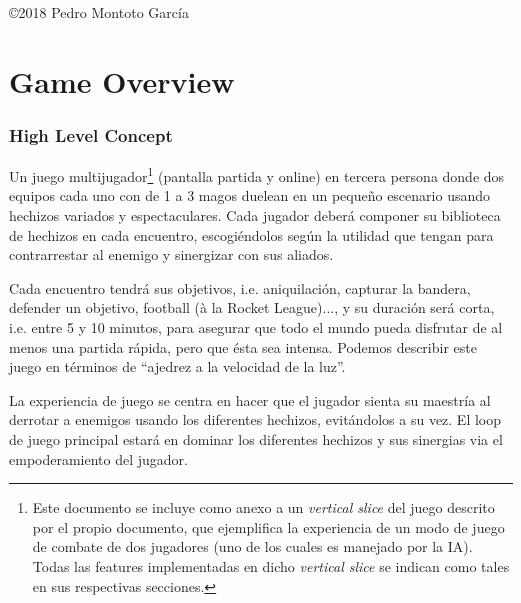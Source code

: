 \documentclass[12pt]{report}
\begin{document}
\vfill %

{\centering \hfill \copyright 2018 Pedro Montoto García} \\


\clearpage

\tableofcontents

\cleardoublepage

\setlength{\voffset}{0cm}
\setlength{\parindent}{1cm}
\setcounter{page}{1}

\part{Game Overview}

\section{High Level Concept}
\pagestyle{fancy}

Un juego multijugador\footnote{Este documento se incluye como anexo a un \textit{vertical slice} del juego descrito por el propio documento, que ejemplifica la experiencia de un modo de juego de combate de dos jugadores (uno de los cuales es manejado por la IA). Todas las features implementadas en dicho \textit{vertical slice} se indican como tales en sus respectivas secciones.} (pantalla partida y online) en tercera persona donde dos equipos cada uno con de 1 a 3 magos duelean en un pequeño escenario usando hechizos variados y espectaculares. Cada jugador deberá componer su biblioteca de hechizos en cada encuentro, escogiéndolos según la utilidad que tengan para contrarrestar al enemigo y sinergizar con sus aliados. 

Cada encuentro tendrá sus objetivos, i.e. aniquilación, capturar la bandera, defender un objetivo, football (à la Rocket League)..., y su duración será corta, i.e. entre 5 y 10 minutos, para asegurar que todo el mundo pueda disfrutar de al menos una partida rápida, pero que ésta sea intensa. Podemos describir este juego en términos de ``ajedrez a la velocidad de la luz''.

La experiencia de juego se centra en hacer que el jugador sienta su maestría al derrotar a enemigos usando los diferentes hechizos, evitándolos a su vez. El loop de juego principal estará en dominar los diferentes hechizos y sus sinergias via el empoderamiento del jugador.
\end{document}
